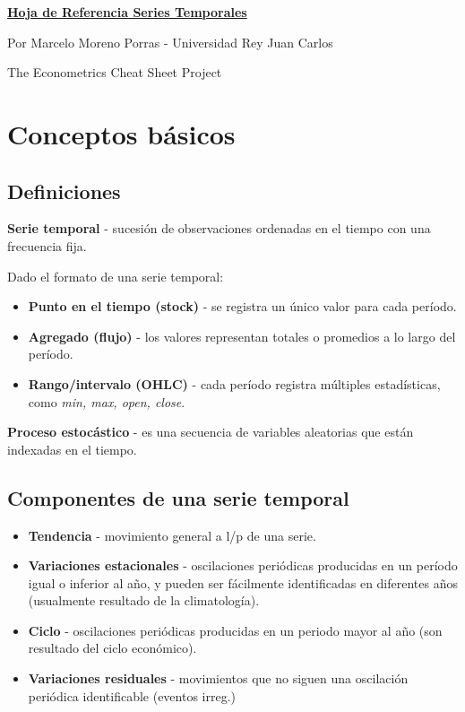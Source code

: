 \documentclass[10pt, a4paper, landscape]{article}
\begin{document}
\begin{multicols}{3}

\begin{center}
	\textbf{\LARGE \href{https://github.com/marcelomijas/econometrics-cheatsheet}{Hoja de Referencia Series Temporales}}

	{\footnotesize Por Marcelo Moreno Porras - Universidad Rey Juan Carlos}

	{\footnotesize The Econometrics Cheat Sheet Project}
\end{center}

\section*{Conceptos básicos}

\subsection*{Definiciones}

\textbf{Serie temporal} - sucesión de observaciones ordenadas en el tiempo con una frecuencia fija.

Dado el formato de una serie temporal:

\begin{itemize}[leftmargin=*]
	\item \textbf{Punto en el tiempo (stock)} - se registra un único valor para cada período.
	\item \textbf{Agregado (flujo)} - los valores representan totales o promedios a lo largo del período.
	\item \textbf{Rango/intervalo (OHLC)} - cada período registra múltiples estadísticas, como \textit{min, max, open, close}.
\end{itemize}

\textbf{Proceso estocástico} - es una secuencia de variables aleatorias que están indexadas en el tiempo.

\subsection*{Componentes de una serie temporal}

\begin{itemize}[leftmargin=*]
	\item \textbf{Tendencia} - movimiento general a l/p de una serie.
	\item \textbf{Variaciones estacionales} - oscilaciones periódicas producidas en un período igual o inferior al año, y pueden ser fácilmente identificadas en diferentes años (usualmente resultado de la climatología).
	\item \textbf{Ciclo} - oscilaciones periódicas producidas en un periodo mayor al año (son resultado del ciclo económico).
	\item \textbf{Variaciones residuales} - movimientos que no siguen una oscilación periódica identificable (eventos irreg.)
\end{itemize}


\end{multicols}
\end{document}
